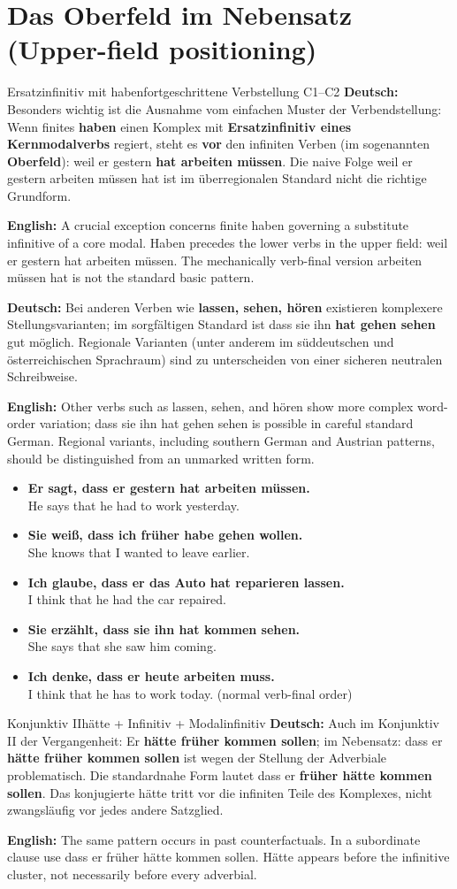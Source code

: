 \documentclass[a4paper,11pt]{article}
\newcommand{\GermanText}[1]{\textbf{Deutsch: }#1\par}
\newcommand{\EnglishText}[1]{{\small\color{SoftGray}\textbf{English: }#1\par}}
\newcommand{\ExampleItem}[2]{\item \textbf{#1}\\{\small\color{SoftGray}#2}}
\newcommand{\DEEN}[2]{\GermanText{#1}\EnglishText{#2}}
\newcommand{\Pair}[2]{\ExampleItem{#1}{#2}}
\begin{document}
\section{Das Oberfeld im Nebensatz \textnormal{(Upper-field positioning)}}
\begin{grammarentry}{Ersatzinfinitiv mit haben}{fortgeschrittene Verbstellung C1--C2}
\DEEN{Besonders wichtig ist die Ausnahme vom einfachen Muster der Verbendstellung: Wenn finites \textbf{haben} einen Komplex mit \textbf{Ersatzinfinitiv eines Kernmodalverbs} regiert, steht es \textbf{vor} den infiniten Verben (im sogenannten \textbf{Oberfeld}): \glqq weil er gestern \textbf{hat arbeiten müssen}\grqq. Die naive Folge \glqq weil er gestern arbeiten müssen hat\grqq{} ist im überregionalen Standard nicht die richtige Grundform.}{A crucial exception concerns finite haben governing a substitute infinitive of a core modal. Haben precedes the lower verbs in the upper field: weil er gestern hat arbeiten müssen. The mechanically verb-final version arbeiten müssen hat is not the standard basic pattern.}
\DEEN{Bei anderen Verben wie \textbf{lassen, sehen, hören} existieren komplexere Stellungsvarianten; im sorgfältigen Standard ist \glqq dass sie ihn \textbf{hat gehen sehen}\grqq{} gut möglich. Regionale Varianten (unter anderem im süddeutschen und österreichischen Sprachraum) sind zu unterscheiden von einer sicheren neutralen Schreibweise.}{Other verbs such as lassen, sehen, and hören show more complex word-order variation; dass sie ihn hat gehen sehen is possible in careful standard German. Regional variants, including southern German and Austrian patterns, should be distinguished from an unmarked written form.}
\end{grammarentry}
\begin{exbox}\begin{itemize}
\Pair{Er sagt, dass er gestern hat arbeiten müssen.}{He says that he had to work yesterday.}
\Pair{Sie weiß, dass ich früher habe gehen wollen.}{She knows that I wanted to leave earlier.}
\Pair{Ich glaube, dass er das Auto hat reparieren lassen.}{I think that he had the car repaired.}
\Pair{Sie erzählt, dass sie ihn hat kommen sehen.}{She says that she saw him coming.}
\Pair{Ich denke, dass er heute arbeiten muss.}{I think that he has to work today. (normal verb-final order)}
\end{itemize}\end{exbox}
\begin{grammarentry}{Konjunktiv II}{hätte + Infinitiv + Modalinfinitiv}
\DEEN{Auch im Konjunktiv II der Vergangenheit: \glqq Er \textbf{hätte früher kommen sollen}\grqq; im Nebensatz: \glqq dass er \textbf{hätte früher kommen sollen}\grqq{} ist wegen der Stellung der Adverbiale problematisch. Die standardnahe Form lautet \glqq dass er \textbf{früher hätte kommen sollen}\grqq. Das konjugierte hätte tritt vor die infiniten Teile des Komplexes, nicht zwangsläufig vor jedes andere Satzglied.}{The same pattern occurs in past counterfactuals. In a subordinate clause use dass er früher hätte kommen sollen. Hätte appears before the infinitive cluster, not necessarily before every adverbial.}
\end{grammarentry}
\end{document}
